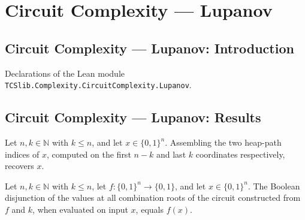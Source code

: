 \section{Circuit Complexity --- Lupanov}
\subsection*{Circuit Complexity --- Lupanov: Introduction}

Declarations of the Lean module \texttt{TCSlib.Complexity.CircuitComplexity.Lupanov}.

\subsection*{Circuit Complexity --- Lupanov: Results}

\begin{theorem}
\label{BoolCircuit.Lupanov.assemble_heapPath}
\leanok
{}
Let $n,k\in\mathbb{N}$ with $k\le n$, and let $x\in\{0,1\}^n$. Assembling the two
heap-path indices of $x$, computed on the first $n-k$ and last $k$ coordinates
respectively, recovers $x$.
\end{theorem}

\begin{theorem}
\label{BoolCircuit.Lupanov.any_comb}
\leanok
{}
Let $n,k\in\mathbb{N}$ with $k\le n$, let $f:\{0,1\}^n\to\{0,1\}$, and let
$x\in\{0,1\}^n$. The Boolean disjunction of the values at all combination roots of the
circuit constructed from $f$ and $k$, when evaluated on input $x$, equals $f(x)$.
\end{theorem}

